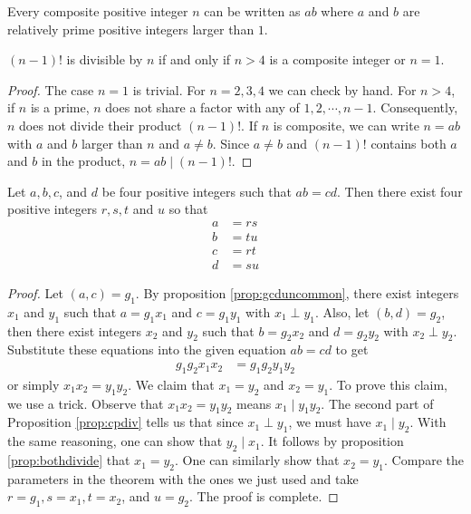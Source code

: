 \documentclass{subfile}
\begin{document}
	\begin{theorem}
		Every composite positive integer $n$ can be written as $ab$ where $a$ and $b$ are relatively prime positive integers larger than $1$.
	\end{theorem}

	\begin{theorem}
		$(n-1)!$ is divisible by $n$ if and only if $n>4$ is a composite integer or $n=1$.\label{thm:cpfct}
	\end{theorem}

	\begin{proof}
		The case $n=1$ is trivial. For $n=2,3,4$ we can check by hand. For $n>4$, if $n$ is a prime, $n$ does not share a factor with any of $1,2,\cdots,n-1$. Consequently, $n$ does not divide their product $(n-1)!$. If $n$ is composite, we can write $n=ab$ with $a$ and $b$ larger than $n$ and $a\neq b$. Since $a\neq b$ and $(n-1)!$ contains both $a$ and $b$ in the product, $n=ab\mid (n-1)!$.
	\end{proof}

	\begin{theorem}
		Let $a, b, c$, and $d$ be four positive integers such that $ab=cd$. Then there exist four positive integers $r,s,t$ and $u$ so that
		\begin{align*}
			a
				& = rs\\
			b
				& = tu\\
			c
				& = rt\\
			d
				& = su
		\end{align*}
	\end{theorem}

	\begin{proof}
		Let $(a,c)=g_1$. By proposition \eqref{prop:gcduncommon}, there exist integers $x_1$ and $y_1$ such that $a=g_1x_1$ and $c=g_1y_1$ with $x_1\perp y_1$. Also, let $(b,d)=g_2$, then there exist integers $x_2$ and $y_2$ such that $b=g_2x_2$ and $d=g_2y_2$ with $x_2\perp y_2$. Substitute these equations into the given equation $ab=cd$ to get
		\begin{align*}
			g_1g_2x_1x_2 & =g_1g_2y_1y_2
		\end{align*}
		or simply $x_1x_2 =y_1y_2$. We claim that $x_1=y_2$ and $x_2=y_1$. To prove this claim, we use a trick. Observe that $x_1x_2=y_1y_2$ means $x_1\mid y_1y_2$. The second part of Proposition \eqref{prop:cpdiv} tells us that since $x_1 \perp y_1$, we must have $x_1\mid y_2$. With the same reasoning, one can show that $y_2\mid x_1$. It follows by proposition \eqref{prop:bothdivide} that $x_1 =y_2$. One can similarly show that $x_2=y_1$. Compare the  parameters in the theorem with the ones we just used and take $r=g_1, s=x_1, t=x_2 $, and $u=g_2$. The proof is complete.
	\end{proof}
\end{document}
